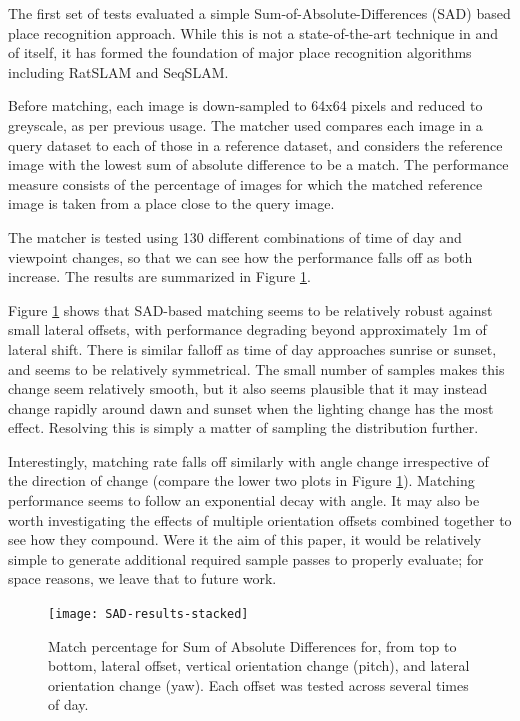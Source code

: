\documentclass[letterpaper, 10 pt, conference]{ieeeconf}  %
\begin{document}
The first set of tests evaluated a simple Sum-of-Absolute-Differences (SAD) based place recognition approach. While this is not a state-of-the-art technique in and of itself, it has formed the foundation of major place recognition algorithms including RatSLAM \cite{milford2010persistent} and SeqSLAM. 

Before matching, each image is down-sampled to 64x64 pixels and reduced to greyscale, as per previous usage. The matcher used compares each image in a query dataset to each of those in a reference dataset, and considers the reference image with the lowest sum of absolute difference to be a match. The performance measure consists of the percentage of images for which the matched reference image is taken from a place close to the query image.

The matcher is tested using 130 different combinations of time of day and viewpoint changes, so that we can see how the performance falls off as both increase. The results are summarized in Figure \ref{fig:sad-results-stacked}.

Figure \ref{fig:sad-results-stacked} shows that SAD-based matching seems to be relatively robust against small lateral offsets, with performance degrading beyond approximately 1m of lateral shift. There is similar falloff as time of day approaches sunrise or sunset, and seems to be relatively symmetrical. The small number of samples makes this change seem relatively smooth, but it also seems plausible that it may instead change rapidly around dawn and sunset when the lighting change has the most effect. Resolving this is simply a matter of sampling the distribution further.

Interestingly, matching rate falls off similarly with angle change irrespective of the direction of change (compare the lower two plots in Figure \ref{fig:sad-results-stacked}). Matching performance seems to follow an exponential decay with angle. It may also be worth investigating the effects of multiple orientation offsets combined together to see how they compound. Were it the aim of this paper, it would be relatively simple to generate additional required sample passes to properly evaluate; for space reasons, we leave that to future work.

\begin{figure}[ht]
    \centering
    \texttt{[image: SAD-results-stacked]}
    \caption{Match percentage for Sum of Absolute Differences for, from top to bottom, lateral offset, vertical orientation change (pitch), and lateral orientation change (yaw). Each offset was tested across several times of day.}
    \label{fig:sad-results-stacked}
\end{figure}
\end{document}
